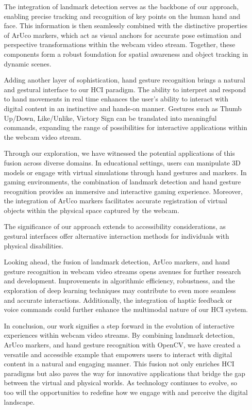 \documentclass[journal]{IEEEtran}
\begin{document}
The integration of landmark detection serves as the backbone of our approach, enabling precise tracking and recognition of 
key points on the human hand and face. This information is then seamlessly combined with the distinctive properties of ArUco markers, 
which act as visual anchors for accurate pose estimation and perspective transformations within the webcam video stream. Together, 
these components form a robust foundation for spatial awareness and object tracking in dynamic scenes.

Adding another layer of sophistication, hand gesture recognition brings a natural and gestural interface to our HCI paradigm. 
The ability to interpret and respond to hand movements in real time enhances the user's ability to interact with digital content 
in an instinctive and hands-on manner. Gestures such as Thumb Up/Down, Like/Unlike, Victory Sign can be translated into meaningful
commands, expanding the range of possibilities for interactive applications within the webcam video stream.

Through our exploration, we have witnessed the potential applications of this fusion across diverse domains. In educational settings, 
users can manipulate 3D models or engage with virtual simulations through hand gestures and markers. In gaming environments, 
the combination of landmark detection and hand gesture recognition provides an immersive and interactive gaming experience. 
Moreover, the integration of ArUco markers facilitates accurate registration of virtual objects within the physical space captured 
by the webcam.

The significance of our approach extends to accessibility considerations, as gestural interfaces offer alternative interaction methods 
for individuals with physical disabilities.

Looking ahead, the fusion of landmark detection, ArUco markers, and hand gesture recognition in webcam video streams opens avenues 
for further research and development. Improvements in algorithmic efficiency, robustness, and the exploration of deep learning 
techniques may contribute to even more seamless and accurate interactions. Additionally, the integration of haptic feedback or 
voice commands could further enhance the multimodal nature of our HCI system.

In conclusion, our work signifies a step forward in the evolution of interactive experiences within webcam video streams. By combining 
landmark detection, ArUco markers, and hand gesture recognition with OpenCV, we have created a versatile and accessible example 
that empowers users to interact with digital content in a natural and engaging manner. This fusion not only enriches HCI paradigms 
but also paves the way for innovative applications that bridge the gap between the virtual and physical worlds. As technology continues 
to evolve, so too will the opportunities to redefine how we engage with and perceive the digital landscape.
\end{document}
